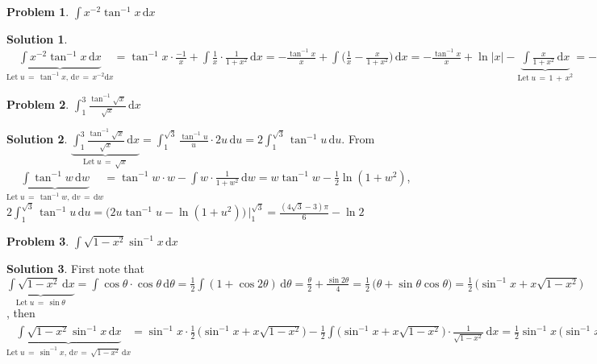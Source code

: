 \documentclass[11pt,a4paper]{article}
\newcommand{\ds}{\displaystyle}
\theoremstyle{definition}
\newtheorem*{problem}{Problem}
\newtheorem*{solution}{Solution}
\begin{document}
\begin{problem}
  $\ds\int\!x^{-2}\tan^{-1}x\,\text{d}x$
\end{problem}

\begin{solution}
  $\ds\underbrace{\int\!x^{-2}\tan^{-1}\!x\,\text{d}x}_{\text{Let}\;u\,=\,\tan^{-1}x,\,\text{d}v\,=\,x^{-2}\text{d}x} = \tan^{-1}\!x\cdot\frac{-1}{x} + \int\!\frac{1}{x}\cdot\frac{1}{1 + x^2}\,\text{d}x = -\frac{\tan^{-1}\!x}{x} + \int\!\Big(\frac{1}{x} - \frac{x}{1 + x^2}\Big)\,\text{d}x = -\frac{\tan^{-1}\!x}{x} + \ln|x| - \underbrace{\int\!\frac{x}{1 + x^2}\,\text{d}x}_{\text{Let}\;u\,=\,1\,+\,x^2} = -\frac{\tan^{-1}\!x}{x} + \ln|x| - \int\!\frac{\frac{\text{d}u}{2}}{u} = -\frac{\tan^{-1}\!x}{x} + \ln|x| - \frac{1}{2}\ln(1 + x^2)$
\end{solution}

\begin{problem}
  $\ds\int_1^3\frac{\tan^{-1}\sqrt{x}}{\sqrt{x}} \,\text{d}x$
\end{problem}

\begin{solution}
  $\ds\underbrace{\int_1^3\frac{\tan^{-1}\sqrt{x}}{\sqrt{x}} \,\text{d}x}_{\text{Let}\;u\,=\,\sqrt{x}} = \int_1^{\sqrt{3}}\frac{\tan^{-1}\!u}{u}\cdot 2u\,\text{d}u = 2\int_1^{\sqrt{3}}\tan^{-1}\!u\,\text{d}u$. From $\ds\underbrace{\int\tan^{-1}\!w\,\text{d}w}_{\text{Let}\;u\,=\,\tan^{-1}w,\,\text{d}v\,=\,\text{d}w} = \tan^{-1}\!w\cdot w - \int\!w\cdot\frac{1}{1 + w^2}\,\text{d}w = w\tan^{-1}\!w - \frac{1}{2}\ln(1 + w^2)$, $\ds 2\int_1^{\sqrt{3}}\tan^{-1}\!u\,\text{d}u = \big(2u\tan^{-1}\!u - \ln(1 + u^2)\big)\,\Big|_1^{\sqrt{3}} = \frac{(4\sqrt{3} - 3)\pi}{6} - \ln 2$
\end{solution}

\begin{problem}
  $\ds\int\!\sqrt{1-x^2}\sin^{-1} x\,\text{d}x$
\end{problem}

\begin{solution}
  First note that $\ds\underbrace{\int\!\sqrt{1 - x^2}\,\text{d}x}_{\text{Let}\;u\,=\,\sin\theta} = \int\!\cos\theta\cdot\cos\theta\,\text{d}\theta = \frac{1}{2}\int\!(1 + \cos 2\theta)\,\text{d}\theta = \frac{\theta}{2} + \frac{\sin 2\theta}{4} = \frac{1}{2}\,\big(\theta + \sin\theta\cos\theta\big) = \frac{1}{2}\,\big(\sin^{-1}\!x + x\sqrt{1 - x^2}\big)$, then $\ds\underbrace{\int\!\sqrt{1-x^2}\sin^{-1} x\,\text{d}x}_{\text{Let}\;u\,=\,\sin^{-1}x,\,\text{d}v\,=\,\sqrt{1 - x^2}\,\text{d}x} = \sin^{-1}\!x\cdot\frac{1}{2}\,\big(\sin^{-1}\!x + x\sqrt{1 - x^2}\big) - \frac{1}{2}\int\!\big(\sin^{-1}\!x + x\sqrt{1 - x^2}\big)\cdot\frac{1}{\sqrt{1 - x^2}}\,\text{d}x = \frac{1}{2}\sin^{-1}\!x\,\big(\sin^{-1}\!x + x\sqrt{1 - x^2}\big) - \frac{1}{2}\int\!\Big(\frac{\sin^{-1}\!x}{\sqrt{1 - x^2}} + x\Big)\,\text{d}x = \frac{1}{2}\sin^{-1}\!x\,\big(\sin^{-1}\!x + x\sqrt{1 - x^2}\big) - \frac{x^2}{4} - \frac{1}{2}\underbrace{\int\!\frac{\sin^{-1}\!x}{\sqrt{1 - x^2}}\,\text{d}x}_{\text{Let}\;u\,=\,\sin^{-1}x} = \frac{1}{2}\sin^{-1}\!x\,\big(\sin^{-1}\!x + x\sqrt{1 - x^2}\big) - \frac{x^2}{4} - \frac{1}{4}\,(\sin^{-1}\!x)^2 = \frac{1}{4}\,(\sin^{-1}\!x)^2 + \frac{1}{2}\,x\sqrt{1 - x^2}\,\sin^{-1}\!x - \frac{x^2}{4}$
\end{solution}
\end{document}
